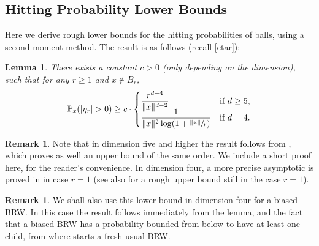 \documentclass[11pt]{article}
\numberwithin{equation}{section}
\theoremstyle{plain}
\newtheorem{lemma}[theorem]{Lemma}
\theoremstyle{definition}
\newtheorem{remark}[theorem]{Remark}
\newcommand{\1}{{\text{\Large $\mathfrak 1$}}}
\begin{document}
\subsection{Hitting Probability Lower Bounds}\label{sec.hitting}
Here we derive rough lower bounds for the hitting probabilities of balls, using a second moment method. The result is as follows (recall \eqref{etar}):

\begin{lemma}\label{lem.hitting}
There exists a constant $c>0$ (only depending on the dimension),
such that for any $r\ge 1$ and $x\notin B_r$,\vspace*{-3pt}\enlargethispage{\baselineskip}
\begin{equation*}
\mathbb P_x(|\eta_r|>0) \ge c\cdot
\begin{cases}
\dfrac{r^{d-4}}{\|x\|^{d-2}} & \text{if }d\ge 5, \\[-3pt]
\dfrac 1{\|x\|^2\log (1+\sfrac{\|x\|}{r}) }& \text{if }d=4.
\end{cases}
\end{equation*}
\end{lemma}

\begin{remark}
Note that in dimension five and higher the result follows from \cite{Zhu1}, which proves as well an upper bound of the same order.
We include a short proof here, for the reader's convenience.
In dimension four, a more precise asymptotic is proved in
\cite{Zhu3} in case $r=1$ (see also \cite{Zhu4} for a rough upper bound still in the case $r=1$).
\end{remark}

\begin{remark} \label{rem.lb.biased}
We shall also use this lower bound in dimension four for a biased BRW. In this case the result follows immediately from the lemma, and the fact that a biased BRW has a probability bounded from below to have at least one child, from where starts a fresh usual BRW.
\end{remark}
\end{document}
